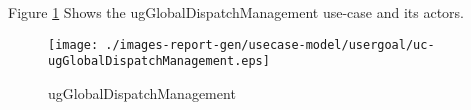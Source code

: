 Figure \ref{fig:lu.uni.lassy.excalibur.group09.spec-RE-UCD-uc-ugGlobalDispatchManagement}
Shows the ugGlobalDispatchManagement use-case and its actors.

\begin{figure}[htbp]
\begin{center}

\texttt{[image: ./images-report-gen/usecase-model/usergoal/uc-ugGlobalDispatchManagement.eps]}
\end{center}
\caption[lu.uni.lassy.excalibur.group09.spec Use Case Diagram: uc-ugGlobalDispatchManagement]{ugGlobalDispatchManagement}
\label{fig:lu.uni.lassy.excalibur.group09.spec-RE-UCD-uc-ugGlobalDispatchManagement}
\end{figure}
\vspace{0.5cm}
